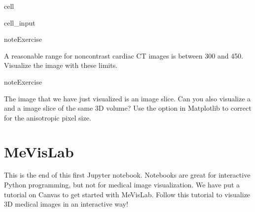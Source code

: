 \documentclass[letterpaper,10pt,english]{jupyterBook}
\begin{document}
\begin{sphinxuseclass}{cell}\begin{sphinxVerbatimInput}

\begin{sphinxuseclass}{cell_input}
\begin{sphinxVerbatim}[commandchars=\\\{\}]
\PYG{p}{[}  \PYG{p}{]}   
\end{sphinxVerbatim}

\end{sphinxuseclass}\end{sphinxVerbatimInput}

\end{sphinxuseclass}
\begin{sphinxadmonition}{note}{Exercise}

\sphinxAtStartPar
A reasonable range for non\sphinxhyphen{}contrast cardiac CT images is between \sphinxhyphen{}300 and 450. Visualize the image with these limits.
\end{sphinxadmonition}

\begin{sphinxadmonition}{note}{Exercise}

\sphinxAtStartPar
The image that we have just visualized is an  image slice. Can you also visualize a  and a  image slice of the same 3D volume? Use the  option in Matplotlib to correct for the anisotropic pixel size.
\end{sphinxadmonition}


\section{MeVisLab}
\label{\detokenize{notebooks/Tutorial1_NumpySimpleITK/Tutorial1_NumpySimpleITK_student:mevislab}}
\sphinxAtStartPar
This is the end of this first Jupyter notebook. Notebooks are great for interactive Python programming, but not for medical image visualization. We have put a tutorial on Canvas to get started with MeVisLab. Follow this tutorial to visualize 3D medical images in an interactive way!
\end{document}
